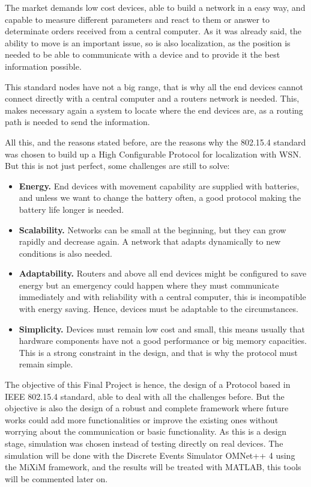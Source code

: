 The market demands low cost devices, able to build a network in a easy way, and capable to measure different parameters and react to them
or answer to determinate orders received from a central computer. As it was already said, the ability to move is an important issue, so is 
also localization, as the position is needed to be able to communicate with a device and to provide it the best information possible.

This standard nodes have not a big range, that is why all the end devices cannot connect directly with a central computer and a routers network 
is needed. This, makes necessary again a system to locate where the end devices are, as a routing path is needed to send the information.

All this, and the reasons stated before, are the reasons why the 802.15.4 standard was chosen to build up a High Configurable Protocol for 
localization with \ac{WSN}. But this is not just perfect, some challenges are still to solve:

\begin{itemize}
 \item \textbf{Energy.} End devices with movement capability are supplied with batteries, and unless we want to change the battery often,
a good protocol making the battery life longer is needed.
 \item \textbf{Scalability.} Networks can be small at the beginning, but they can grow rapidly and decrease again. A network that adapts 
dynamically to new conditions is also needed.
 \item \textbf{Adaptability.} Routers and above all end devices might be configured to save energy but an emergency could happen where they 
must communicate immediately and with reliability with a central computer, this is incompatible with energy saving. Hence, devices must be
adaptable to the circumstances.
 \item \textbf{Simplicity.} Devices must remain low cost and small, this means usually that hardware components have not a good performance
or big memory capacities. This is a strong constraint in the design, and that is why the protocol must remain simple.
\end{itemize}

The objective of this Final Project is hence, the design of a Protocol based in \ac{IEEE} 802.15.4 standard, able to deal with all the 
challenges before. But the objective is also the design of a robust and complete framework where future works could add more functionalities
or improve the existing ones without worrying about the communication or basic functionality.
As this is a design stage, simulation was chosen instead of testing directly on real devices. The simulation will be done with the Discrete 
Events Simulator OMNet++ 4 using the \ac{MiXiM} framework, and the results will be treated with \ac{MATLAB}, this tools will be commented later on.

